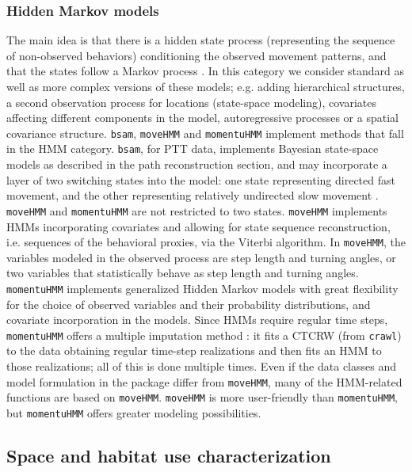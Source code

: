 \documentclass[a4paper,12pt]{article}
\newcommand{\Rpkg}[1]{\texttt{#1}}
\begin{document}
\subsubsection*{Hidden Markov models}

The main idea is that there is a hidden state process (representing the sequence of non-observed behaviors) conditioning the observed movement patterns, and that the states follow a Markov process \citep{Langrock2012}. In this category we consider standard as well as more complex versions of these models; e.g. adding hierarchical structures, a second observation process for locations (state-space modeling), covariates affecting different components in the model, autoregressive processes or a spatial covariance structure. \Rpkg{bsam}, \Rpkg{moveHMM} and \Rpkg{momentuHMM} implement methods that fall in the HMM category. \Rpkg{bsam}, for PTT data, implements Bayesian state-space models as described in the path reconstruction section, and may incorporate a layer of two switching states into the model: one state representing directed fast movement, and the other representing relatively undirected slow movement \citep{Jonsen2013}. \Rpkg{moveHMM} and \Rpkg{momentuHMM} are not restricted to two states. \Rpkg{moveHMM} implements HMMs incorporating covariates and allowing for state sequence reconstruction, i.e. sequences of the behavioral proxies, via the Viterbi algorithm. In \Rpkg{moveHMM}, the variables modeled in the observed process are step length and turning angles, or two variables that statistically behave as step length and turning angles. \Rpkg{momentuHMM} implements generalized Hidden Markov models \citep{McClintock2012} with great flexibility for the choice of observed variables and their probability distributions, and covariate incorporation in the models. Since HMMs require regular time steps, \Rpkg{momentuHMM} offers a multiple imputation method \citep{McClintock2017}: it fits a CTCRW (from \Rpkg{crawl}) to the data obtaining regular time-step realizations and then fits an HMM to those realizations; all of this is done multiple times. Even if the data classes and model formulation in the package differ from \Rpkg{moveHMM}, many of the HMM-related functions are based on \Rpkg{moveHMM}. \Rpkg{moveHMM} is more user-friendly than \Rpkg{momentuHMM}, but \Rpkg{momentuHMM} offers greater modeling possibilities. 

\subsection*{Space and habitat use characterization}
\end{document}
